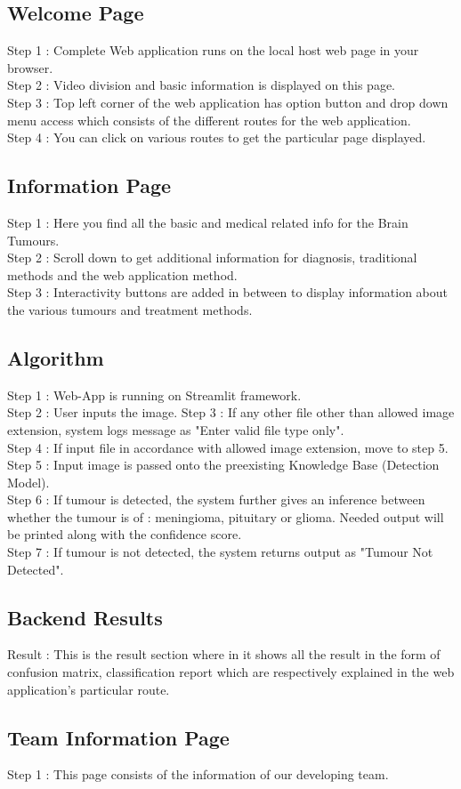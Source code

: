 \subsection{Welcome Page}
Step 1 : Complete Web application runs on the local host web page in your browser.\\
Step 2 : Video division and basic information is displayed on this page.\\
Step 3 : Top left corner of the web application has option button and drop down menu access which consists of the different routes for the web application.\\
Step 4 : You can click on various routes to get the particular page displayed.

\subsection{Information Page}
Step 1 : Here you find all the basic and medical related info for the Brain Tumours.\\
Step 2 : Scroll down to get additional information for diagnosis, traditional methods and the web application method.\\
Step 3 : Interactivity buttons are added in between to display information about the various tumours and treatment methods.

\subsection{Algorithm}
Step 1 : Web-App is running on Streamlit framework.\\
Step 2 : User inputs the image.
Step 3 : If any other file other than allowed image extension, system logs message as "Enter valid file type only".\\
Step 4 : If input file in accordance with allowed image extension, move to step 5.\\
Step 5 : Input image is passed onto the preexisting Knowledge Base (Detection Model).\\
Step 6 : If tumour is detected, the system further gives an inference between whether the tumour is of : meningioma, pituitary or glioma. Needed output will be printed along with the confidence score.\\
Step 7 : If tumour is not detected, the system returns output as "Tumour Not Detected".

\subsection{Backend Results}
Result : This is the result section where in it shows all the result in the form of confusion matrix, classification report which are respectively explained in the web application's particular route.

\subsection{Team Information Page}
Step 1 : This page consists of the information of our developing team.\\
